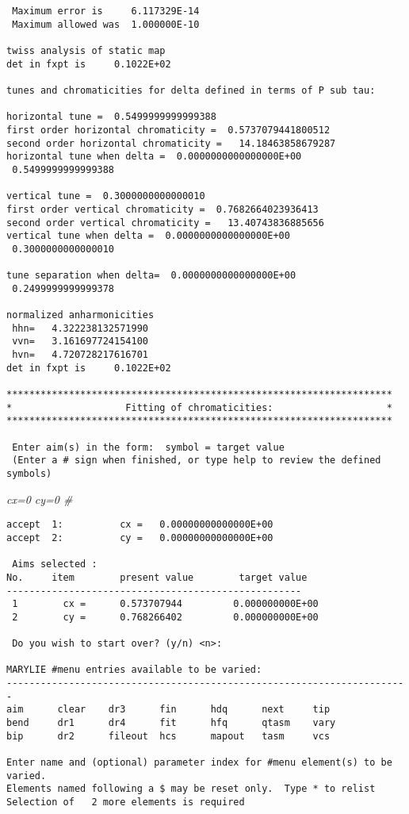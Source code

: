 \begin{footnotesize}
\begin{verbatim}
 Maximum error is     6.117329E-14
 Maximum allowed was  1.000000E-10

twiss analysis of static map
det in fxpt is     0.1022E+02

tunes and chromaticities for delta defined in terms of P sub tau:

horizontal tune =  0.5499999999999388
first order horizontal chromaticity =  0.5737079441800512
second order horizontal chromaticity =   14.18463858679287
horizontal tune when delta =  0.0000000000000000E+00
 0.5499999999999388

vertical tune =  0.3000000000000010
first order vertical chromaticity =  0.7682664023936413
second order vertical chromaticity =   13.40743836885656
vertical tune when delta =  0.0000000000000000E+00
 0.3000000000000010

tune separation when delta=  0.0000000000000000E+00
 0.2499999999999378

normalized anharmonicities
 hhn=   4.322238132571990
 vvn=   3.161697724154100
 hvn=   4.720728217616701
det in fxpt is     0.1022E+02

********************************************************************
*                    Fitting of chromaticities:                    *
********************************************************************

 Enter aim(s) in the form:  symbol = target value
 (Enter a # sign when finished, or type help to review the defined symbols)
\end{verbatim}
\end{footnotesize}
{\em cx=0 cy=0 \#}
\begin{footnotesize}
\begin{verbatim}
accept  1:          cx =   0.00000000000000E+00
accept  2:          cy =   0.00000000000000E+00

 Aims selected :
No.     item        present value        target value
----------------------------------------------------
 1        cx =      0.573707944         0.000000000E+00
 2        cy =      0.768266402         0.000000000E+00

 Do you wish to start over? (y/n) <n>:

MARYLIE #menu entries available to be varied:
-----------------------------------------------------------------------
aim      clear    dr3      fin      hdq      next     tip
bend     dr1      dr4      fit      hfq      qtasm    vary
bip      dr2      fileout  hcs      mapout   tasm     vcs

Enter name and (optional) parameter index for #menu element(s) to be varied.
Elements named following a $ may be reset only.  Type * to relist
Selection of   2 more elements is required
\end{verbatim}
\end{footnotesize}
